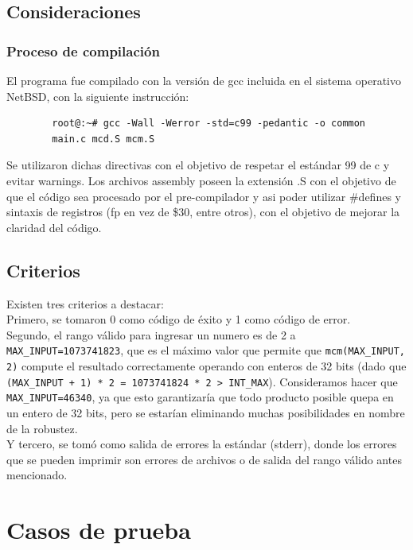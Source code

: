 \documentclass[a4paper,10pt]{article}
\def\code#1{\texttt{#1}}
\begin{document}
    \subsection{Consideraciones}
    \subsubsection{Proceso de compilación}
    El programa fue compilado con la versión de gcc incluida en el sistema operativo NetBSD, con la siguiente instrucción:\\
    \begin{verbatim}
        root@:~# gcc -Wall -Werror -std=c99 -pedantic -o common
        main.c mcd.S mcm.S
    \end{verbatim}
    Se utilizaron dichas directivas con el objetivo de respetar el estándar 99 de c y evitar warnings. Los archivos assembly poseen la extensión .S con el objetivo de que el código sea procesado por el pre-compilador y asi poder utilizar \#defines y sintaxis de registros (fp en vez de \$30, entre otros), con el objetivo de mejorar la claridad del código.
    
    \subsection{Criterios}
    Existen tres criterios a destacar:\\
    Primero, se tomaron 0 como código de éxito y 1 como código de error.\\
    Segundo, el rango válido para ingresar un numero es de 2 a \code{MAX\_INPUT=1073741823}, que es el máximo valor que permite que \code{mcm(MAX\_INPUT, 2)} compute el resultado correctamente operando con enteros de 32 bits (dado que \code{(MAX\_INPUT + 1) * 2 = 1073741824 * 2 > INT\_MAX}). Consideramos hacer que \code{MAX\_INPUT=46340}, ya que esto garantizaría que todo producto posible quepa en un entero de 32 bits, pero se estarían eliminando muchas posibilidades en nombre de la robustez.\\
    Y tercero, se tomó como salida de errores la estándar (stderr), donde los errores que se pueden imprimir son errores de archivos o de salida del rango válido antes mencionado.\\


\section{Casos de prueba}
\end{document}
